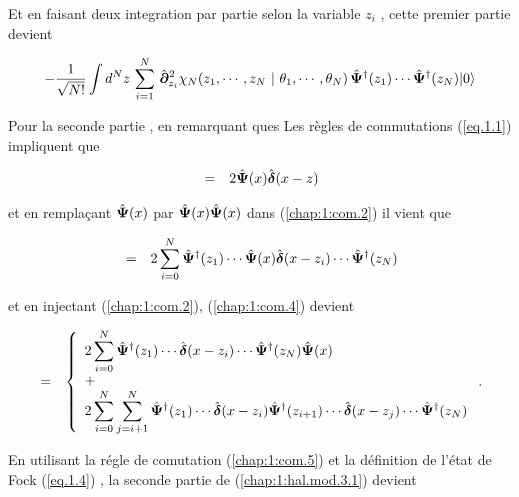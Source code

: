 {{Et en faisant deux integration par partie selon la variable $z_i$ , cette premier partie devient

\begin{eqnarray}
	 - \frac{1}{ \sqrt{N!}} \int d^N z \, \sum_{i=1}^N \, \hat{\bm{\partial}}_{z_i}^2\chi_N ( z_1 , \cdots , z_N  ~\vert ~ \theta_1 , \cdots , \theta _N ) \,	 \hat{\bm{\Psi}}^\dag(z_1)  \cdots\hat{\bm{\Psi}}^\dag(z_N) \vert 0 \rangle \label{chap:1:hal.mod.3.1.1}	
\end{eqnarray}

Pour la seconde partie  , en remarquant ques Les règles de commutations (\ref{eq.1.1}) impliquent que 

\begin{eqnarray}
	[ \operator{\Psi}(x) \operator{\Psi}(x),  \operator{\Psi}^\dag(z) ] & =& 2\operator{\Psi}(x)\operator{\delta}(x - z)\label{chap:1:com.3}  		
\end{eqnarray}

et en remplaçant $\hat{\bm{\Psi}}(x)$ par $\hat{\bm{\Psi}}(x)\hat{\bm{\Psi}}(x)$ dans  (\ref{chap:1:com.2}) il vient que  

\begin{eqnarray}
	[ \operator{\Psi}(x)\operator{\Psi}(x),  \operator{\Psi}^\dag(z_1)\cdots \operator{\Psi}^\dag(z_N)  ]  &=&  2\sum_{i = 0}^{N} \operator{\Psi}^\dag(z_1) \cdots  \operator{\Psi}(x)\operator{\delta}(x-z_i) \cdots \operator{\Psi}^\dag(z_N) \label{chap:1:com.4}		
\end{eqnarray}

et en injectant (\ref{chap:1:com.2}),  (\ref{chap:1:com.4}) devient 

\begin{eqnarray}
	[ \operator{\Psi}(x)\operator{\Psi}(x),  \operator{\Psi}^\dag(z_1)\cdots \operator{\Psi}^\dag(z_N)  ]  &=& \left\{ \begin{array}{l} \displaystyle 2\sum_{i = 0}^{N} \operator{\Psi}^\dag(z_1) \cdots  \operator{\delta}(x-z_i) \cdots \operator{\Psi}^\dag(z_N) \operator{\Psi}(x) \\ + \\ \displaystyle 2\sum_{i = 0}^{N}\sum_{j = i+1}^{N} \operator{\Psi}^\dag(z_1) \cdots\operator{\delta}(x-z_i)\operator{\Psi}^\dag(z_{i+1})\cdots  \operator{\delta}(x-z_j) \cdots \operator{\Psi}^\dag(z_N) \end{array}\right. \label{chap:1:com.5}	.	
\end{eqnarray}

En utilisant la régle de comutation (\ref{chap:1:com.5}) et la définition de l'état de Fock (\ref{eq.1.4}) , la seconde partie de (\ref{chap:1:hal.mod.3.1}) devient

}}
